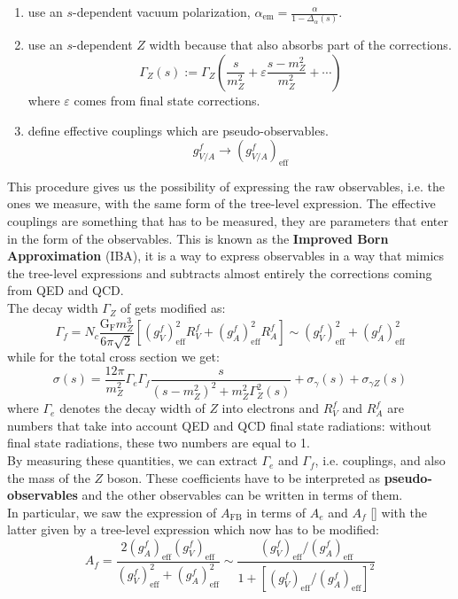 \documentclass[../main.tex]{subfiles}
\begin{document}
\begin{enumerate}[label=\roman*)]
    \item use an $s$-dependent vacuum polarization, $\alpha_{\text{em}}=\frac{\alpha}{1-\Delta_\alpha(s)}$.
    \item use an $s$-dependent $Z$ width because that also absorbs part of the corrections.
    \[
    \Gamma_Z(s):=\Gamma_Z\left(\frac{s}{m_Z^2}+\varepsilon\frac{s-m_Z^2}{m_Z^2}+\cdots\right)
    \]
    where $\varepsilon$ comes from final state corrections.
    \item define effective couplings which are pseudo-observables.
    \[
    g_{V/A}^f\to(g_{V/A}^f)_{\text{eff}}
    \]
\end{enumerate}
This procedure gives us the possibility of expressing the raw observables, i.e. the ones we measure, with the same form of the tree-level expression. The effective couplings are something that has to be measured, they are parameters that enter in the form of the observables. This is known as the \textbf{Improved Born Approximation} (IBA), it is a way to express observables in a way that mimics the tree-level expressions and subtracts almost entirely the corrections coming from QED and QCD.\\
The decay width $\Gamma_Z$ of  gets modified as:
\[
\Gamma_f=N_c\frac{\text{G}_\text{F}m_Z^3}{6\pi\sqrt{2}}\left[(g_V^f)^2_{\text{eff}}R_V^f+(g_A^f)^2_{\text{eff}}R_A^f\right]\sim(g_V^f)_{\text{eff}}^2+(g_A^f)_{\text{eff}}^2 
\]
while for the total cross section we get:
\[
\sigma(s)=\frac{12\pi}{m_Z^2}\Gamma_e\Gamma_f\frac{s}{(s-m_Z^2)^2+m_Z^2\Gamma_Z^2(s)}+\sigma_\gamma(s)+\sigma_{\gamma Z}(s)
\]
where $\Gamma_e$ denotes the decay width of $Z$ into electrons and $R_V^f$ and $R_A^f$ are numbers that take into account QED and QCD final state radiations: without final state radiations, these two numbers are equal to 1.\\
By measuring these quantities, we can extract $\Gamma_e$ and $\Gamma_f$, i.e. couplings, and also the mass of the $Z$ boson. These coefficients have to be interpreted as \textbf{pseudo-observables} and the other observables can be written in terms of them.\\
In particular, we saw the expression of $A_{\text{FB}}$ in terms of $A_e$ and $A_f$ [] with the latter given by a tree-level expression which now has to be modified:
\[
A_f=\frac{2(g_A^f)_{\text{eff}}(g_V^f)_{\text{eff}}}{(g_V^f)_{\text{eff}}^2+(g_A^f)_{\text{eff}}^2}\sim\frac{(g_V^f)_{\text{eff}}/(g_A^f)_{\text{eff}}}{1+[(g_V^f)_{\text{eff}}/(g_A^f)_{\text{eff}}]^2}
\]
\end{document}
